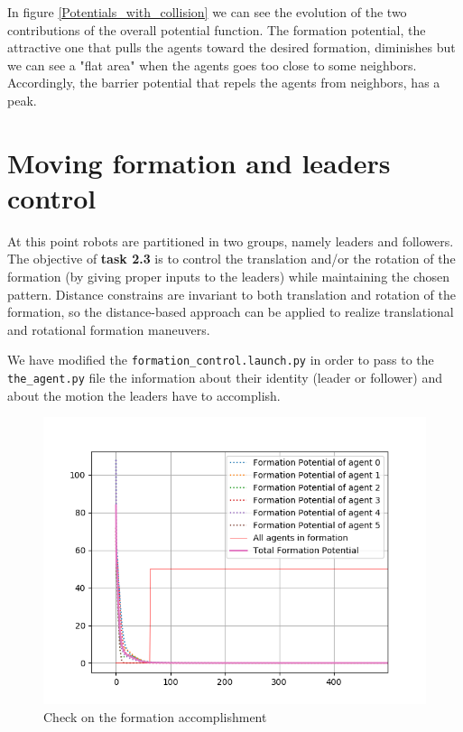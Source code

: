 \documentclass[a4paper,11pt,oneside]{book}
\begin{document}
In figure \ref{Potentials_with_collision} we can see the evolution of the two contributions of the overall potential function. The formation potential, the attractive one that pulls the agents toward the desired formation, diminishes but we can see a "flat area" when the agents goes too close to some neighbors. Accordingly, the barrier potential that repels the agents from neighbors, has a peak.

\section{Moving formation and leaders control}
At this point robots are partitioned in two groups, namely leaders and followers. The objective of \textbf{task 2.3} is to control the translation and/or the rotation of the formation (by giving proper inputs to the leaders) while maintaining the chosen pattern.
Distance constrains  are invariant to both translation and rotation of the formation, so the distance-based approach can be applied to realize translational and rotational formation maneuvers. 

We have modified the \texttt{formation\_control.launch.py} in order to pass to the \texttt{the\_agent.py} file the information about their identity (leader or follower) and about the motion the leaders have to accomplish.

\begin{figure}[h]
\centering
	\includegraphics[scale=0.4]{Formation_check}
	\caption{Check on the formation accomplishment}
	\label{Check}
\end{figure}
\end{document}
